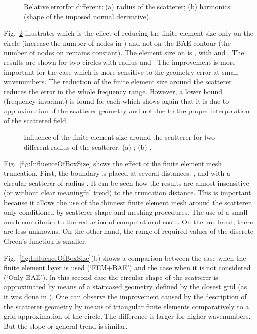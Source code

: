 \documentclass[12pt]{article}
\newcommand{\fref}[1]{Fig.~\ref{#1}}
\begin{document}
\begin{figure}[ht]
 
\caption{Relative errorfor different: (a) radius of the scatterer; (b) harmonics (shape of the imposed normal derivative).}
\label{fig:InfluenceOfRadiusAndHarmonic}
\end{figure}

\fref{fig:InfluenceOfFemSize} illustrates which is the effect of reducing the finite element size only on the circle (increase the number of nodes in ) and not on the BAE contour (the number of nodes on  remains constant). The element size on  is , with  and . The results are shown for two circles with radius  and . The improvement is more important for the case  which is more sensitive to the geometry error at small wavenumbers. The reduction of the finite element size around the scatterer reduces the error in the whole frequency range. However, a lower bound (frequency invariant) is found for each  which shows again that it is due to approximation of the scatterer geometry and not due to the proper interpolation of the scattered field.

\begin{figure}[ht]
 
\caption{Influence of the finite element size around the scatterer for two different radius of the scatterer: (a) ; (b) .}
\label{fig:InfluenceOfFemSize}
\end{figure}

\fref{fig:InfluenceOfBoxSize} shows the effect of the finite element mesh truncation. First, the boundary  is placed at several distances: ,  and  with a circular scatterer of radius . It can be seen how the results are almost insensitive (or without clear meaningful trend) to the truncation distance. This is important because it allows the use of the thinnest finite element mesh around the scatterer, only conditioned by scatterer shape and meshing procedures. The use of a small mesh contributes to the reduction of computational costs. On the one hand, there are less unknowns. On the other hand, the range of required values of the discrete Green's function is smaller.

\fref{fig:InfluenceOfBoxSize}(b) shows a comparison between the case when the finite element layer is used (`FEM+BAE') and the case when it is not considered (`Only BAE'). In this second case the circular shape of the scatterer is approximated by means of a staircased geometry, defined by the closest grid (as it was done in \cite{poblet-PVS:2015}). 
One can observe the improvement caused by the description of the scatterer geometry by means of triangular finite elements comparatively to a grid approximation of the circle. The difference is larger for higher wavenumbers. But the slope or general trend is similar.
\end{document}
